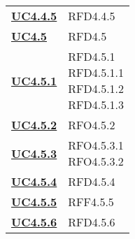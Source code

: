 \begin{longtable}[H]{| >{\centering\bfseries}p{8cm} | >{\centering\arraybackslash}p{8cm} |}
    \hyperref[par:uc4.4.5]{UC4.4.5}  & RFD4.4.5                                                                  \\




    \hyperref[ssub:uc4.5]{UC4.5}     & RFD4.5                                                                    \\

    \hyperref[par:uc4.5.1]{UC4.5.1}  & \makecell{
        \rule{0pt}{4ex}
    RFD4.5.1                                                                                                     \\
    RFD4.5.1.1                                                                                                   \\
    RFD4.5.1.2                                                                                                   \\
    RFD4.5.1.3                                                                                                   \\
        \rule{0pt}{4ex}
    }                                                                                                            \\

    \hyperref[par:uc4.5.2]{UC4.5.2}  & RFO4.5.2                                                                  \\

    \hyperref[par:uc4.5.3]{UC4.5.3}  & \makecell{
        \rule{0pt}{4ex}
    RFO4.5.3.1                                                                                                   \\
    RFO4.5.3.2                                                                                                   \\
        \rule{0pt}{4ex}
    }                                                                                                            \\

    \hyperref[par:uc4.5.4]{UC4.5.4}  & RFD4.5.4                                                                  \\

    \hyperref[par:uc4.5.5]{UC4.5.5}  & RFF4.5.5                                                                  \\

    \hyperref[par:uc4.5.6]{UC4.5.6}  & RFD4.5.6                                                                  \\


\end{longtable}
